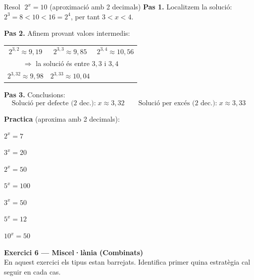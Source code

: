 \documentclass[12pt,a4paper]{article}
\newcounter{tipus}
\begin{document}
\begin{tcolorbox}[exemplebox]
Resol $\;2^x = 10$ \quad (aproximació amb 2 decimals)
\tcblower
\textbf{Pas 1.} Localitzem la solució:
\quad $2^3 = 8 < 10 < 16 = 2^4$, \quad per tant $3 < x < 4$.

\vspace{0.3cm}
\textbf{Pas 2.} Afinem provant valors intermedis:

\medskip
\begin{center}
\renewcommand{\arraystretch}{1.4}
\begin{tabular}{ccc}
$2^{3{,}2} \approx 9{,}19$ & $2^{3{,}3} \approx 9{,}85$ & $2^{3{,}4} \approx 10{,}56$ \\
\multicolumn{3}{c}{$\Rightarrow$ la solució és entre $3{,}3$ i $3{,}4$} \\[4pt]
$2^{3{,}32} \approx 9{,}98$ & $2^{3{,}33} \approx 10{,}04$ & \\
\end{tabular}
\end{center}

\vspace{0.2cm}
\textbf{Pas 3.} Conclusions:
\[
\text{Solució per defecte (2 dec.):}\; x \approx 3{,}32 \qquad
\text{Solució per excés (2 dec.):}\; x \approx 3{,}33
\]
\end{tcolorbox}

\vspace{0.4cm}
\noindent\textbf{Practica} (aproxima amb 2 decimals):

\begin{exercicis}
    \item $2^x = 7$
    \item $3^x = 20$
    \item $2^x = 50$
    \item $5^x = 100$
    \item $3^x = 50$
    \item $5^x = 12$
    \item $10^x = 50$
\end{exercicis}

\vspace{0.6cm}
\noindent\textbf{Exercici 6 --- Miscel·lània (Combinats)} \\
En aquest exercici els tipus estan barrejats. Identifica primer quina estratègia cal seguir en cada cas.
\end{document}
